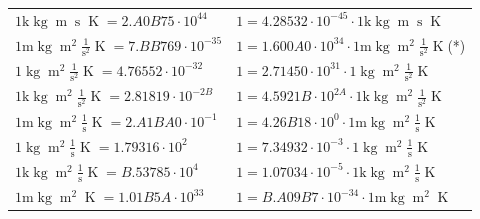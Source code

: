 \begin{center}
\begin{longtable}{l l}
{\color{gray}$1 \bm{\mathrm{ k}}\operatorname{kg}{\operatorname{m}}{\operatorname{s}}{}{\operatorname{K}} = 2.A0B75\cdot10^{44} $}   & {\color{gray}$ 1 = 4.28532\cdot10^{-45} \cdot 1 \bm{\mathrm{ k}}\operatorname{kg}{\operatorname{m}}{\operatorname{s}}{}{\operatorname{K}}$}  \\
{\color{gray}$1 \bm{\mathrm{ m}}\operatorname{kg}{\operatorname{m}^2}\frac1{\operatorname{s}^2}{}{\operatorname{K}} = 7.BB769\cdot10^{-35} $}   & {\color{gray}$ 1 = 1.600A0\cdot10^{34} \cdot 1 \bm{\mathrm{ m}}\operatorname{kg}{\operatorname{m}^2}\frac1{\operatorname{s}^2}{}{\operatorname{K}}$}\quad(*)\\
{\color{black}$1 \bm{\mathrm{ }}\operatorname{kg}{\operatorname{m}^2}\frac1{\operatorname{s}^2}{}{\operatorname{K}} = 4.76552\cdot10^{-32} $}   & {\color{black}$ 1 = 2.71450\cdot10^{31} \cdot 1 \bm{\mathrm{ }}\operatorname{kg}{\operatorname{m}^2}\frac1{\operatorname{s}^2}{}{\operatorname{K}}$}  \\
{\color{gray}$1 \bm{\mathrm{ k}}\operatorname{kg}{\operatorname{m}^2}\frac1{\operatorname{s}^2}{}{\operatorname{K}} = 2.81819\cdot10^{-2B} $}   & {\color{gray}$ 1 = 4.5921B\cdot10^{2A} \cdot 1 \bm{\mathrm{ k}}\operatorname{kg}{\operatorname{m}^2}\frac1{\operatorname{s}^2}{}{\operatorname{K}}$}  \\
{\color{gray}$1 \bm{\mathrm{ m}}\operatorname{kg}{\operatorname{m}^2}\frac1{\operatorname{s}}{}{\operatorname{K}} = 2.A1BA0\cdot10^{-1} $}   & {\color{gray}$ 1 = 4.26B18\cdot10^{0} \cdot 1 \bm{\mathrm{ m}}\operatorname{kg}{\operatorname{m}^2}\frac1{\operatorname{s}}{}{\operatorname{K}}$}  \\
{\color{black}$1 \bm{\mathrm{ }}\operatorname{kg}{\operatorname{m}^2}\frac1{\operatorname{s}}{}{\operatorname{K}} = 1.79316\cdot10^{2} $}   & {\color{black}$ 1 = 7.34932\cdot10^{-3} \cdot 1 \bm{\mathrm{ }}\operatorname{kg}{\operatorname{m}^2}\frac1{\operatorname{s}}{}{\operatorname{K}}$}  \\
{\color{gray}$1 \bm{\mathrm{ k}}\operatorname{kg}{\operatorname{m}^2}\frac1{\operatorname{s}}{}{\operatorname{K}} = B.53785\cdot10^{4} $}   & {\color{gray}$ 1 = 1.07034\cdot10^{-5} \cdot 1 \bm{\mathrm{ k}}\operatorname{kg}{\operatorname{m}^2}\frac1{\operatorname{s}}{}{\operatorname{K}}$}  \\
{\color{gray}$1 \bm{\mathrm{ m}}\operatorname{kg}{\operatorname{m}^2}{}{}{\operatorname{K}} = 1.01B5A\cdot10^{33} $}   & {\color{gray}$ 1 = B.A09B7\cdot10^{-34} \cdot 1 \bm{\mathrm{ m}}\operatorname{kg}{\operatorname{m}^2}{}{}{\operatorname{K}}$}  \\

\end{longtable}
\end{center}
